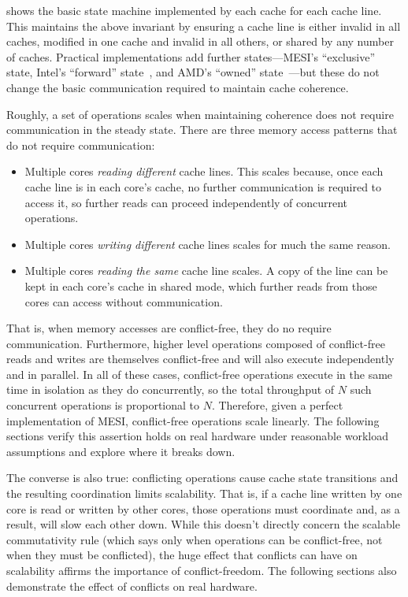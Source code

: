  shows the basic state machine implemented by each
cache for each cache line.  This maintains the above invariant by
ensuring a cache line is either invalid in all caches, modified in one
cache and invalid in all others, or shared by any number of caches.
Practical implementations add further states---MESI's ``exclusive''
state, Intel's ``forward'' state~\cite{goodman:mesif}, and AMD's
``owned'' state~\cite[\S7.3]{amd-arch-2}---but these do not change the
basic communication required to maintain cache coherence.

Roughly, a set of operations scales when maintaining coherence does
not require communication in the steady state.
%
There are three memory access patterns that do not require
communication:
\begin{itemize}
\item
Multiple cores \emph{reading different} cache lines.  This scales
because, once each
cache line is in each core's cache, no further communication is
required to access it, so further reads can proceed independently of
concurrent operations.
%
\item
Multiple cores \emph{writing different} cache lines scales for much
the same reason.
%
\item
Multiple cores \emph{reading the same} cache line scales.
A copy of the line can be kept in each core's cache in shared mode,
which further reads from those cores can access without
communication.
\end{itemize}
%
That is, when memory accesses are conflict-free, they do no require
communication.
%
Furthermore, higher level operations composed of conflict-free reads
and writes are
themselves conflict-free and will also execute independently and in
parallel.
%
In all of these cases, conflict-free operations execute in the same
time in isolation as they do concurrently, so the total throughput of
$N$ such concurrent operations is proportional to $N$.
%
Therefore, given a perfect implementation of MESI, conflict-free
operations scale linearly.  The following sections verify this
assertion holds on real hardware under reasonable workload assumptions
and explore where it breaks down.


The converse is also true: conflicting operations cause
cache state transitions and the resulting coordination limits
scalability.
%
That is, if a cache line written by one core is read or written by
other cores, those operations must
coordinate and, as a result, will slow each other down.  While this
doesn't directly concern the scalable commutativity rule (which says
only when operations can be conflict-free, not when they must be
conflicted), the huge effect that conflicts can have on scalability
affirms the importance of conflict-freedom.  The following sections
also demonstrate the effect of conflicts on real hardware.

